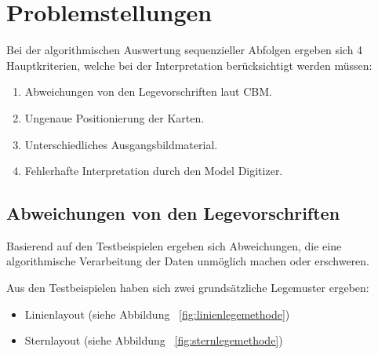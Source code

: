 \section{Problemstellungen} %
\label{sec:problemstellungen}
Bei der algorithmischen Auswertung sequenzieller Abfolgen ergeben sich 4 Hauptkriterien, welche bei der Interpretation berücksichtigt werden müssen:
\begin{enumerate}
	\item Abweichungen von den Legevorschriften laut CBM.
	\item Ungenaue Positionierung der Karten.
	\item Unterschiedliches Ausgangsbildmaterial.
	\item Fehlerhafte Interpretation durch den Model Digitizer.
\end{enumerate}

\subsection{Abweichungen von den Legevorschriften} %
\label{ssub:abweichung_von_der_legevorschriften}
Basierend auf den Testbeispielen \cite{max} ergeben sich Abweichungen, die eine algorithmische Verarbeitung der Daten unmöglich machen oder erschweren.

Aus den Testbeispielen haben sich zwei grundsätzliche Legemuster ergeben:

\begin{itemize}
	\item Linienlayout (siehe Abbildung ~\ref{fig:linienlegemethode}) 
	\item Sternlayout (siehe Abbildung ~\ref{fig:sternlegemethode}) 
\end{itemize}

